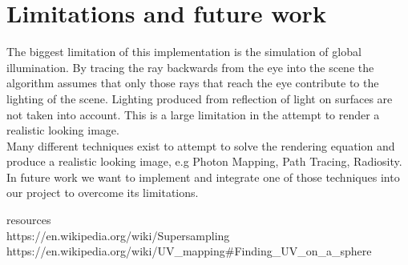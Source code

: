 \documentclass[sigconf, nonacm]{acmart}
\begin{document}
\section{Limitations and future work}
The biggest limitation of this implementation is the simulation of global illumination. By tracing the ray backwards from the eye into the scene
the algorithm assumes that only those rays that reach the eye contribute to the lighting of the scene. Lighting produced from reflection of light 
on surfaces are not taken into account. This is a large limitation in the attempt to render a realistic looking image.\\
Many different techniques exist to attempt to solve the rendering equation and produce a realistic looking image, 
e.g Photon Mapping, Path Tracing, Radiosity. In future work we want to implement and integrate one of those techniques into our project to overcome its limitations.





\clearpage

resources\\
https://en.wikipedia.org/wiki/Supersampling \\
https://en.wikipedia.org/wiki/UV_mapping#Finding_UV_on_a_sphere \\







% 
% 
\end{document}
